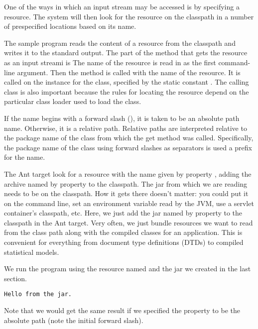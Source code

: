 One of the ways in which an input stream may be accessed is by
specifying a resource.  The system will then look for the resource on
the classpath in a number of prespecified locations based on its name.

The sample program  reads the content of a
resource from the classpath and writes it to the standard output.
The part of the  method that gets the resource as
an input streami is
%
%
The name of the resource is read in as the first command-line
argument.  Then the method  is
called with the name of the resource.  It is called on the
 instance for the  class, specified by
the static constant .  The calling class is
also important because the rules for locating the resource depend on
the particular class loader used to load the class.

If the name begins with a forward slash (\code{/}), it is taken to be
an absolute path name.  Otherwise, it is a relative path.  Relative
paths are interpreted relative to the package name of the class from
which the get method was called.  Specifically, the package name of
the class using forward slashes as separators is used a prefix for the
name.  

The Ant target  look for a resource with the name
given by property , adding the archive named by
property  to the classpath.  The jar from which we
are reading needs to be on the classpath.  How it gets there doesn't
matter: you could put it on the command line, set an environment
variable read by the JVM, use a servlet container's classpath, etc.
Here, we just add the jar named by property  to the
classpath in the Ant target.  Very often, we just bundle resources
we want to read from the class path along with the compiled classes
for an application.  This is convenient for everything from document
type definitions (DTDs) to compiled statistical models.

We run the program using the resource named 
and the jar we created in the last section.
%
\begin{verbatim}
Hello from the jar.
\end{verbatim}
%
Note that we would get the same result if we specified the
 property to be the absolute path
 (note the initial forward
slash).

